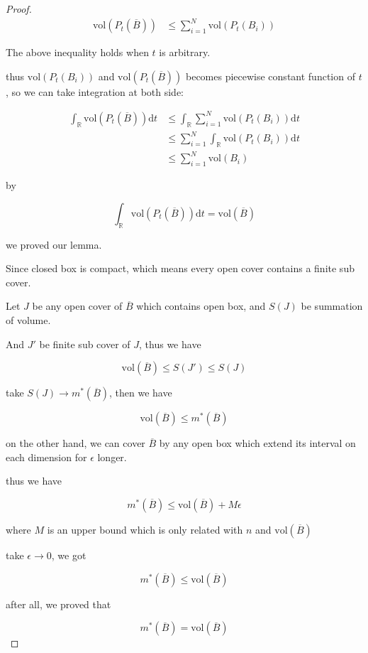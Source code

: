 \begin{proof}
    \begin{align*}
        \mathrm{vol}(P_t(\overline{B})) &\le \sum_{i=1}^{N} \mathrm{vol}(P_t(B_i))
    \end{align*}

    The above inequality holds when $t$ is arbitrary.

    thus $\mathrm{vol}(P_t(B_i))$ and $\mathrm{vol}(P_t(\overline{B}))$ becomes piecewise constant function of $t$, so we can take integration at both side:

    \begin{align*}
        \int_{\mathbb{R}}\mathrm{vol}(P_t(\overline{B})) \mathrm{d}t  &\le \int_{\mathbb{R}}\sum_{i=1}^{N} \mathrm{vol}(P_t(B_i)) \mathrm{d}t \\
        & \le \sum_{i=1}^{N} \int_{\mathbb{R}}\mathrm{vol}(P_t(B_i)) \mathrm{d}t \\
        & \le \sum_{i=1}^{N}\mathrm{vol}(B_i)
    \end{align*}

    by

    \[
\int_{\mathbb{R}}\mathrm{vol}(P_t(\overline{B})) \mathrm{d}t = \mathrm{vol}(\overline{B})
    \]

    we proved our lemma.


    Since closed box is compact, which means every open cover contains a finite sub cover.
    
    Let $J$ be any open cover of $\overline{B}$ which contains open box, and $S(J)$ be summation of volume.

    And $J'$ be finite sub cover of $J$, thus we have

    \[
        \mathrm{vol}(\overline{B}) \le S(J') \le S(J)
    \]

    take $S(J) \to m^*(\overline{B})$, then we have

    \[
        \mathrm{vol}(\overline{B}) \le m^*(\overline{B})
    \]

    on the other hand, we can cover $\overline{B}$ by any open box which extend 
    its interval on each dimension for $\epsilon$ longer.

    thus we have

    \[
        m^*(\overline{B}) \le \mathrm{vol}(\overline{B}) + M\epsilon
    \]

    where $M$ is an upper bound which is only related with $n$ and $\mathrm{vol}(\overline{B})$

    take $\epsilon \to 0$, we got


    \[
        m^*(\overline{B}) \le \mathrm{vol}(\overline{B})
    \]

    after all, we proved that

    \[
        m^*(\overline{B}) = \mathrm{vol}(\overline{B})
    \]
\end{proof}

